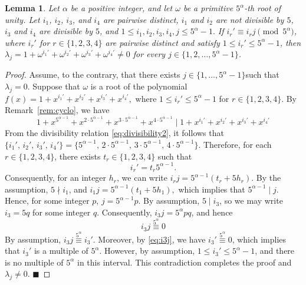 \documentclass[12pt]{article}
\newtheorem{lemA}[propA]{Lemma}
\begin{document}
  \begin{lemA}\label{lemb_7}
 	Let $\alpha$ be a positive integer, and let $\omega$ be a primitive $5^\alpha$-th root of unity. Let $i_1$, $i_2$, $i_3$, and $i_4$ are pairwise distinct, $i_1$ and $i_2$ are not divisible by $5$, $i_3$ and $i_4$ are divisible by $5$, and
 	$
 	1\le i_1,i_2,i_3,i_4,j\le5^\alpha-1.
 	$
   If $i_r' \equiv i_rj \pmod{5^\alpha}$, where $i_r'$ for $r\in\{1,2,3,4\}$ are pairwise distinct and satisfy $1\le i_r'\le5^\alpha-1$,
 	then
 	$
 	\lambda_j=1+\omega^{i_1'}+\omega^{i_2'}+\omega^{i_3'}+\omega^{i_4'}\neq0
 	$
 	for every $j\in\{1,2,\ldots,5^\alpha-1\}$.
  	\end{lemA}
  	\begin{proof}
  		Assume, to the contrary, that there exists $j\in\{1,\ldots,5^\alpha-1\}$such that $\lambda_j=0$. Suppose that $\omega$ is a root of the polynomial
  		$
  		f(x)=1+x^{i_1'}+x^{i_2'}+x^{i_3'}+x^{i_4'} ,
  		$
  		where $1\le i_r'\le5^\alpha-1$ for $r\in\{1,2,3,4\}$. By Remark~\ref{rem:cyclo}, we have
    \begin{equation}\label{eq:divisibility2}
    	1+x^{5^{\alpha-1}}+x^{2\cdot5^{\alpha-1}}+x^{3\cdot5^{\alpha-1}}+x^{4\cdot5^{\alpha-1}} \mid
    	1+x^{i_1'}+x^{i_2'}+x^{i_3'}+x^{i_4'}
    \end{equation}
   From the divisibility relation \eqref{eq:divisibility2}, it follows that $
   \{i_1',\,i_2',\,i_3',\,i_4'\}=\{5^{\alpha-1},\,2\cdot5^{\alpha-1},\,3\cdot5^{\alpha-1},\,4\cdot5^{\alpha-1}\}.
   $ Therefore, for each $r\in\{1,2,3,4\}$, there exists $t_r\in\{1,2,3,4\}$ such that
   \begin{equation}\label{eq:...}
   	i_r'=t_r5^{\alpha-1}.
   \end{equation}
   Consequently, for an integer $h_r$, we can write
   $
   i_rj=5^{\alpha-1}(t_r+5h_r).
   $
   By the assumption, $5\nmid i_1$, and
   $
   i_1j=5^{\alpha-1}(t_1+5h_1),
   $
   which implies that
   $
   5^{\alpha-1}\mid j.
   $ Hence, for some integer $p$, $j=5^{\alpha-1}p$. By assumption, $5\mid i_3$, so we may write $i_3=5q$ for some integer $q$. Consequently, $i_3j=5^{\alpha}pq$, and hence
   \begin{equation}\label{eq:i3j}
 i_3 j \overset{5^\alpha}{\equiv} 0
   \end{equation}
 By assumption, $i_3j \overset{5^\alpha}{\equiv} i_3'$. Moreover, by \eqref{eq:i3j}, we have $i_3' \overset{5^\alpha}{\equiv} 0$, which implies that $i_3'$ is a multiple of $5^\alpha$. However, by assumption, $1\le i_3'\le 5^\alpha-1$, and there is no multiple of $5^\alpha$ in this interval. This contradiction completes the proof and $\lambda_j\neq 0$.  \hfill$\blacksquare$
  		\end{proof}
\end{document}
